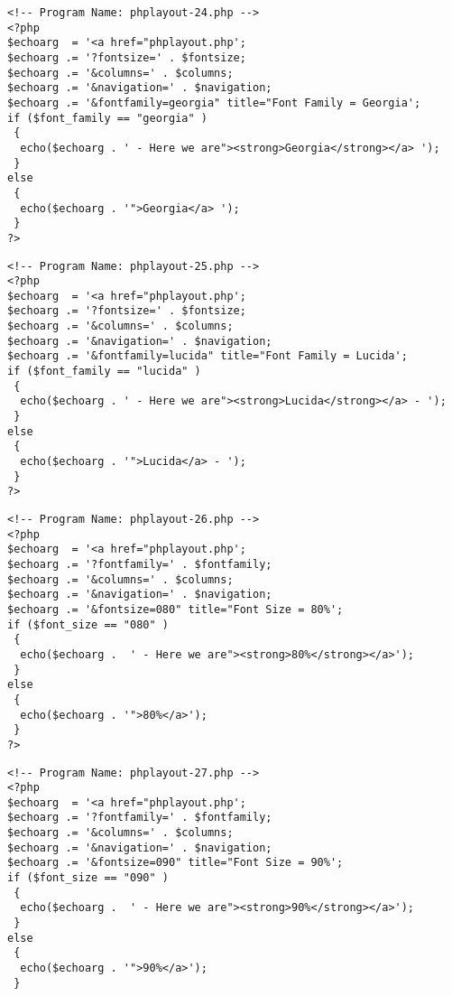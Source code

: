\documentclass[12pt,a4paper,twosides,ngerman]{scrbook}
\begin{document}
\begin{center}
\begin{minipage}[t]{155mm}
\begin{lstlisting}[captionpos=b, caption=Layout - phplayout-24.php]
<!-- Program Name: phplayout-24.php -->
<?php
$echoarg  = '<a href="phplayout.php';
$echoarg .= '?fontsize=' . $fontsize; 
$echoarg .= '&columns=' . $columns;
$echoarg .= '&navigation=' . $navigation;
$echoarg .= '&fontfamily=georgia" title="Font Family = Georgia';
if ($font_family == "georgia" )
 {
  echo($echoarg . ' - Here we are"><strong>Georgia</strong></a> ');
 }
else
 {
  echo($echoarg . '">Georgia</a> ');
 }
?>
\end{lstlisting}
\end{minipage}
\end{center} 

\begin{center}
\begin{minipage}[t]{155mm}
\begin{lstlisting}[captionpos=b, caption=Layout - phplayout-25.php]
<!-- Program Name: phplayout-25.php -->
<?php
$echoarg  = '<a href="phplayout.php';
$echoarg .= '?fontsize=' . $fontsize; 
$echoarg .= '&columns=' . $columns;
$echoarg .= '&navigation=' . $navigation;
$echoarg .= '&fontfamily=lucida" title="Font Family = Lucida';
if ($font_family == "lucida" )
 {
  echo($echoarg . ' - Here we are"><strong>Lucida</strong></a> - ');
 }
else
 {
  echo($echoarg . '">Lucida</a> - ');
 }
?>
\end{lstlisting}
\end{minipage}
\end{center} 

\begin{center}
\begin{minipage}[t]{155mm}
\begin{lstlisting}[captionpos=b, caption=Layout - phplayout-26.php]
<!-- Program Name: phplayout-26.php -->
<?php
$echoarg  = '<a href="phplayout.php';
$echoarg .= '?fontfamily=' . $fontfamily; 
$echoarg .= '&columns=' . $columns;
$echoarg .= '&navigation=' . $navigation;
$echoarg .= '&fontsize=080" title="Font Size = 80%';
if ($font_size == "080" )
 {
  echo($echoarg .  ' - Here we are"><strong>80%</strong></a>');
 }
else
 {
  echo($echoarg . '">80%</a>');
 }
?>
\end{lstlisting}
\end{minipage}
\end{center} 

\begin{center}
\begin{minipage}[t]{155mm}
\begin{lstlisting}[captionpos=b, caption=Layout - phplayout-27.php]
<!-- Program Name: phplayout-27.php -->
<?php
$echoarg  = '<a href="phplayout.php';
$echoarg .= '?fontfamily=' . $fontfamily; 
$echoarg .= '&columns=' . $columns;
$echoarg .= '&navigation=' . $navigation;
$echoarg .= '&fontsize=090" title="Font Size = 90%';
if ($font_size == "090" )
 {
  echo($echoarg .  ' - Here we are"><strong>90%</strong></a>');
 }
else
 {
  echo($echoarg . '">90%</a>');
 }
\end{lstlisting}
\end{minipage}
\end{center} 
\end{document}
